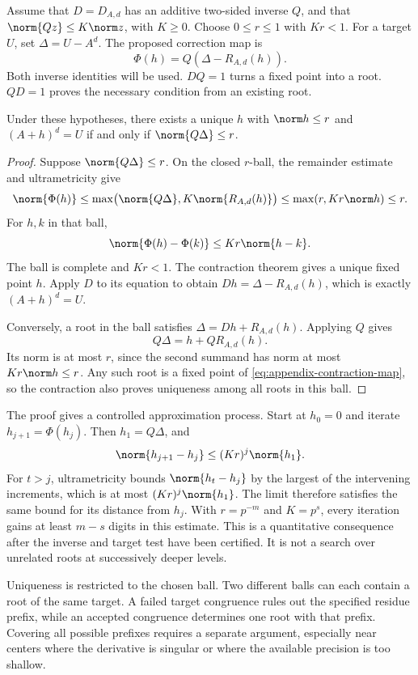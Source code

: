 Assume that $D=D_{A,d}$ has an additive two-sided inverse $Q$, and that
$\norm{Qz}\le K\norm z$, with $K\ge0$. Choose $0\le r\le1$ with $Kr<1$. For a
target $U$, set $\Delta=U-A^d$. The proposed correction map is
\begin{equation}
 \Phi(h)=Q(\Delta-R_{A,d}(h)).
 \label{eq:appendix-contraction-map}
\end{equation}
Both inverse identities will be used. $DQ=1$ turns a fixed point into a
root. $QD=1$ proves the necessary condition from an existing root.

\begin{theorem}
Under these hypotheses, there exists a unique $h$ with $\norm h\le r$
and $(A+h)^d=U$ if and only if $\norm{Q\Delta}\le r$.
\label{thm:appendix-local-image}
\end{theorem}

\begin{proof}
Suppose $\norm{Q\Delta}\le r$. On the closed $r$-ball, the remainder
estimate and ultrametricity give
\[
 \norm{\Phi(h)}
 \le\max\bigl(\norm{Q\Delta},K\norm{R_{A,d}(h)}\bigr)
 \le\max(r,Kr\norm h)\le r.
\]
For $h,k$ in that ball,
\[
 \norm{\Phi(h)-\Phi(k)}\le Kr\norm{h-k}.
\]
The ball is complete and $Kr<1$. The contraction theorem gives a unique
fixed point $h$. Apply $D$ to its equation to obtain
$Dh=\Delta-R_{A,d}(h)$, which is exactly $(A+h)^d=U$.

Conversely, a root in the ball satisfies $\Delta=Dh+R_{A,d}(h)$. Applying
$Q$ gives
\[
 Q\Delta=h+QR_{A,d}(h).
\]
Its norm is at most $r$, since the second summand has norm at most
$Kr\norm h\le r$. Any such root is a fixed point of
\eqref{eq:appendix-contraction-map}, so the contraction also proves
uniqueness among all roots in this ball.
\end{proof}

The proof gives a controlled approximation process. Start at $h_0=0$ and
iterate $h_{j+1}=\Phi(h_j)$. Then $h_1=Q\Delta$, and
\[
 \norm{h_{j+1}-h_j}\le (Kr)^j\norm{h_1}.
\]
For $t>j$, ultrametricity bounds $\norm{h_t-h_j}$ by the largest of
the intervening increments, which is at most $(Kr)^j\norm{h_1}$. The
limit therefore satisfies the same bound for its distance from $h_j$.
With $r=p^{-m}$ and $K=p^s$, every iteration gains at least $m-s$
digits in this estimate. This is a quantitative consequence after the
inverse and target test have been certified. It is not a search over
unrelated roots at successively deeper levels.

Uniqueness is restricted to the chosen ball. Two different balls can each
contain a root of the same target. A failed target congruence rules out
the specified residue prefix, while an accepted congruence determines
one root with that prefix. Covering all possible prefixes requires a
separate argument, especially near centers where the derivative is
singular or where the available precision is too shallow.

